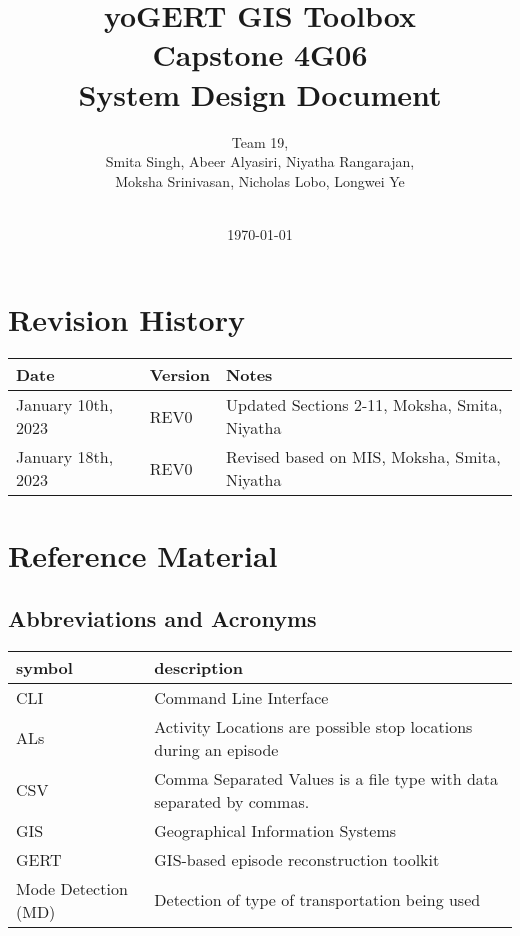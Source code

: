 \documentclass[12pt, titlepage]{article}
\begin{document}
\title{\textbf{yoGERT GIS Toolbox}\\ Capstone 4G06\\ System Design Document}
\author{Team 19,
		\\ Smita Singh, Abeer Alyasiri, Niyatha Rangarajan,\\ Moksha Srinivasan, Nicholas Lobo, Longwei Ye \\\\
}
\date{\today}

\maketitle


\section{Revision History}

\begin{tabularx}{\textwidth}{p{3cm}p{2cm}X}
\toprule {\bf Date} & {\bf Version} & {\bf Notes}\\
\midrule
January 10th, 2023 & REV0 & Updated Sections 2-11, Moksha, Smita, Niyatha\\
January 18th, 2023 & REV0 & Revised based on MIS, Moksha, Smita, Niyatha \\
\bottomrule
\end{tabularx}

\newpage

\section{Reference Material}

\subsection{Abbreviations and Acronyms}

\renewcommand{\arraystretch}{1.2}
\begin{tabular}{l l} 
  \toprule		
  \textbf{symbol} & \textbf{description}\\
  \midrule 
   CLI & Command Line Interface\\
   ALs & Activity Locations are possible stop locations during an episode \\
   CSV & Comma Separated Values is a file type with data separated by commas. \\
   GIS & Geographical Information Systems\\
   GERT & GIS-based episode reconstruction toolkit \\
   Mode Detection (MD) & Detection of type of transportation being used \\
  \bottomrule
\end{tabular}\\
\end{document}
